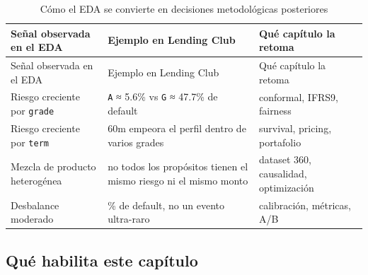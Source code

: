 \documentclass[
  spanish,
  11pt,
  letterpaper,
]{scrbook}
\theoremstyle{plain}
\theoremstyle{remark}
\begin{document}
\begin{longtable}[]{@{}
  >{\raggedright\arraybackslash}p{}
  >{\raggedright\arraybackslash}p{}
  >{\raggedright\arraybackslash}p{}@{}}
\caption{Cómo el EDA se convierte en decisiones metodológicas
posteriores}\label{tbl-eda-to-method}\tabularnewline
\toprule\noalign{}
\begin{minipage}[b]{\linewidth}\raggedright
Señal observada en el EDA
\end{minipage} & \begin{minipage}[b]{\linewidth}\raggedright
Ejemplo en Lending Club
\end{minipage} & \begin{minipage}[b]{\linewidth}\raggedright
Qué capítulo la retoma
\end{minipage} \\
\midrule\noalign{}
\endfirsthead
\toprule\noalign{}
\begin{minipage}[b]{\linewidth}\raggedright
Señal observada en el EDA
\end{minipage} & \begin{minipage}[b]{\linewidth}\raggedright
Ejemplo en Lending Club
\end{minipage} & \begin{minipage}[b]{\linewidth}\raggedright
Qué capítulo la retoma
\end{minipage} \\
\midrule\noalign{}
\endhead
\bottomrule\noalign{}
\endlastfoot
Riesgo creciente por \texttt{grade} & \texttt{A} ≈ 5.6\% vs \texttt{G} ≈
47.7\% de default & conformal, IFRS9, fairness \\
Riesgo creciente por \texttt{term} & 60m empeora el perfil dentro de
varios grades & survival, pricing, portafolio \\
Mezcla de producto heterogénea & no todos los propósitos tienen el mismo
riesgo ni el mismo monto & dataset 360, causalidad, optimización \\
Desbalance moderado & 18.5\% de default, no un evento ultra-raro &
calibración, métricas, A/B \\
\end{longtable}

\subsection{Qué habilita este
capítulo}\label{quuxe9-habilita-este-capuxedtulo}
\end{document}
